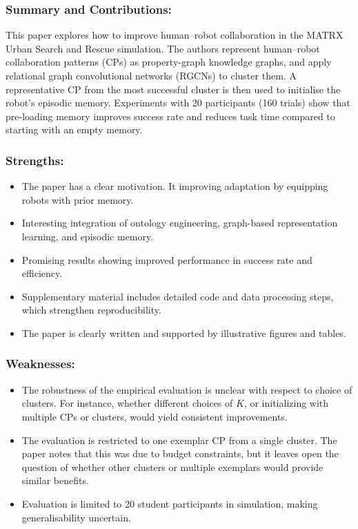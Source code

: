 \documentclass[letterpaper]{article} %
\begin{document}
\subsubsection*{Summary and Contributions:}

This paper explores how to improve human–robot collaboration in the MATRX Urban Search and Rescue simulation. The authors represent human–robot collaboration patterns (CPs) as property-graph knowledge graphs, and apply relational graph convolutional networks (RGCNs) to cluster them. A representative CP from the most successful cluster is then used to initialise the robot’s episodic memory. Experiments with 20 participants (160 trials) show that pre-loading memory improves success rate and reduces task time compared to starting with an empty memory.

\subsubsection*{Strengths:}
\begin{itemize}
\item The paper has a clear motivation. It improving adaptation by equipping robots with prior memory.
\item Interesting integration of ontology engineering, graph-based representation learning, and episodic memory.
\item Promising results showing improved performance in success rate and efficiency.
\item Supplementary material includes detailed code and data processing steps, which strengthen reproducibility.
\item The paper is clearly written and supported by illustrative figures and tables.
\end{itemize}

\subsubsection*{Weaknesses:}
\begin{itemize}
\item The robustness of the empirical evaluation is unclear with respect to choice of clusters. For instance, whether different choices of $K$, or initializing with multiple CPs or clusters, would yield consistent improvements.
\item The evaluation is restricted to one exemplar CP from a single cluster. The paper notes that this was due to budget constraints, but it leaves open the question of whether other clusters or multiple exemplars would provide similar benefits.
\item Evaluation is limited to 20 student participants in simulation, making generalisability uncertain.
\end{itemize}
\end{document}
